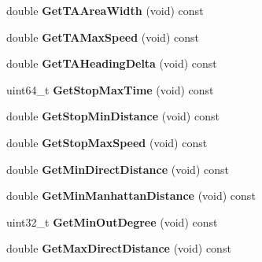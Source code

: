 \begin{DoxyCompactItemize}
\item 
double {\bfseries Get\+T\+A\+Area\+Width} (void) const \hypertarget{classconfig_1_1Config_a8b3a5e57ca8147ceac90433254cf05dd}{}\label{classconfig_1_1Config_a8b3a5e57ca8147ceac90433254cf05dd}

\item 
double {\bfseries Get\+T\+A\+Max\+Speed} (void) const \hypertarget{classconfig_1_1Config_a71b20cbceb08f661543fe55427a91611}{}\label{classconfig_1_1Config_a71b20cbceb08f661543fe55427a91611}

\item 
double {\bfseries Get\+T\+A\+Heading\+Delta} (void) const \hypertarget{classconfig_1_1Config_af27dcdb9d72f9a8dd0f8d5d00418db63}{}\label{classconfig_1_1Config_af27dcdb9d72f9a8dd0f8d5d00418db63}

\item 
uint64\+\_\+t {\bfseries Get\+Stop\+Max\+Time} (void) const \hypertarget{classconfig_1_1Config_a8d770cb431d45f52d0335b93b97475c2}{}\label{classconfig_1_1Config_a8d770cb431d45f52d0335b93b97475c2}

\item 
double {\bfseries Get\+Stop\+Min\+Distance} (void) const \hypertarget{classconfig_1_1Config_a83e8166ecb6c8d54da116561d5bc6b75}{}\label{classconfig_1_1Config_a83e8166ecb6c8d54da116561d5bc6b75}

\item 
double {\bfseries Get\+Stop\+Max\+Speed} (void) const \hypertarget{classconfig_1_1Config_a0e4d218313ce128664d52399118c57a2}{}\label{classconfig_1_1Config_a0e4d218313ce128664d52399118c57a2}

\item 
double {\bfseries Get\+Min\+Direct\+Distance} (void) const \hypertarget{classconfig_1_1Config_ae51148eab432dd67bdf92bd52d15aa7d}{}\label{classconfig_1_1Config_ae51148eab432dd67bdf92bd52d15aa7d}

\item 
double {\bfseries Get\+Min\+Manhattan\+Distance} (void) const \hypertarget{classconfig_1_1Config_a75043d2164ad328bfa733d0d510d21a5}{}\label{classconfig_1_1Config_a75043d2164ad328bfa733d0d510d21a5}

\item 
uint32\+\_\+t {\bfseries Get\+Min\+Out\+Degree} (void) const \hypertarget{classconfig_1_1Config_a9dd3815ba64414fe7757f29fb2038326}{}\label{classconfig_1_1Config_a9dd3815ba64414fe7757f29fb2038326}

\item 
double {\bfseries Get\+Max\+Direct\+Distance} (void) const \hypertarget{classconfig_1_1Config_a5a26ca8df757296c0d1c2ba23240f37c}{}\label{classconfig_1_1Config_a5a26ca8df757296c0d1c2ba23240f37c}


\end{DoxyCompactItemize}

